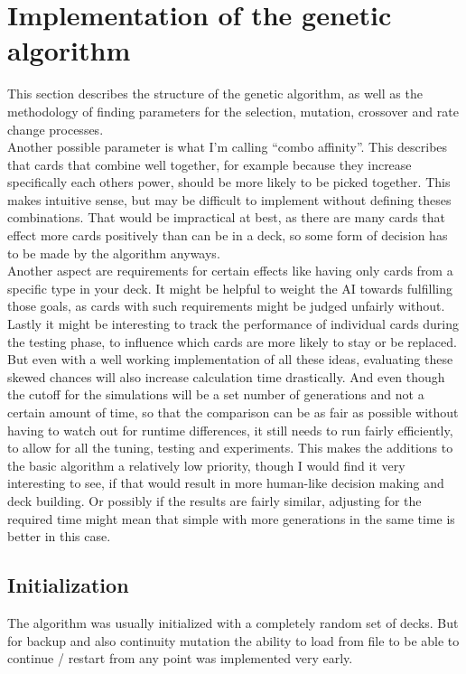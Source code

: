 \section{Implementation of the genetic algorithm}
\label{sec:method:genalg}
This section describes the structure of the genetic algorithm, as well as the methodology of finding parameters for the selection, mutation, crossover and rate change processes. \\
Another possible parameter is what I’m calling “combo affinity”. This describes that cards that combine well together, for example because they increase specifically each others power, should be more likely to be picked together. This makes intuitive sense, but may be difficult to implement without defining theses combinations. That would be impractical at best, as there are many cards that effect more cards positively than can be in a deck, so some form of decision has to be made by the algorithm anyways. \\
Another aspect are requirements for certain effects like having only cards from a specific type in your deck. It might be helpful to weight the AI towards fulfilling those goals, as cards with such requirements might be judged unfairly without. \\
Lastly it might be interesting to track the performance of individual cards during the testing phase, to influence which cards are more likely to stay or be replaced. \\
But even with a well working implementation of all these ideas, evaluating these skewed chances will also increase calculation time drastically. And even though the cutoff for the simulations will be a set number of generations and not a certain amount of time, so that the comparison can be as fair as possible without having to watch out for runtime differences, it still needs to run fairly efficiently, to allow for all the tuning, testing and experiments.
This makes the additions to the basic algorithm a relatively low priority, though I would find it very interesting to see, if that would result in more human-like decision making and deck building. Or possibly if the results are fairly similar, adjusting for the required time might mean that simple with more generations in the same time is better in this case. \\

\subsection{Initialization}
\label{sec:method:genalg:init}
The algorithm was usually initialized with a completely random set of decks. But for backup and also continuity mutation the ability to load from file to be able to continue / restart from any point was implemented very early.

